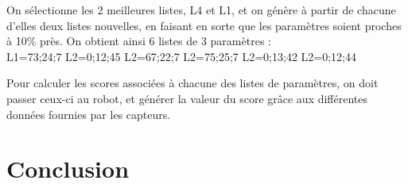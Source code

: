 \documentclass[11pt]{article}
\begin{document}
On sélectionne les 2 meilleures listes, L4 et L1, et on génère à partir de chacune d'elles deux listes nouvelles, en faisant en sorte que les paramètres soient proches à 10\% près. On obtient ainsi 6 listes de 3 paramètres :\\

L1={73;24;7}
L2={0;12;45}
L2={67;22;7}
L2={75;25;7}
L2={0;13;42}
L2={0;12;44}

Pour calculer les scores associées à chacune des listes de paramètres, on doit passer ceux-ci au robot, et générer la valeur du score grâce aux différentes données fournies par les capteurs.

\section{Conclusion}
\end{document}
